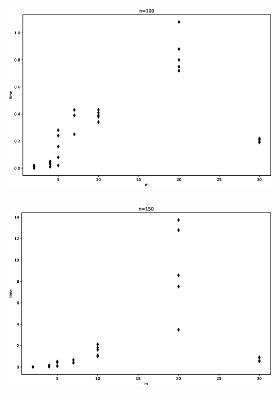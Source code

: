 \begin{figure}[h!]
     \centering
     \begin{subfigure}[b]{\textwidth}
     	\centering
	     \begin{subfigure}[b]{0.32\textwidth}
	         \includegraphics[width=\columnwidth]{images/bagm0.eps}
	     \end{subfigure}
	     \hspace{0em}
	     \begin{subfigure}[b]{0.32\textwidth}
	         \includegraphics[width=\columnwidth]{images/bagm1.eps}
	     \end{subfigure}
	     \hspace{0em}
	     \begin{subfigure}[b]{0.32\textwidth}

\end{subfigure}
\end{subfigure}
\end{figure}
